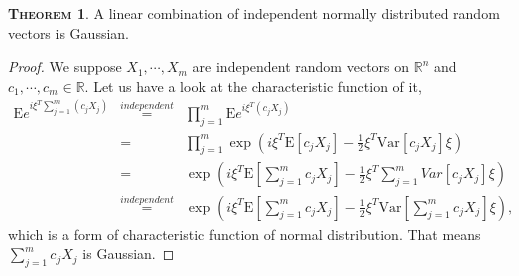 \documentclass[a4paper, twoside, 11pt]{article}
\theoremstyle{definition}
\newtheorem{theorem}[definition]{\scshape Theorem}
\newtheorem{corollary}[definition]{\scshape Corollary}
\newcommand{\brkt}[1]{\left({#1} \right)}
\begin{document}

	


  \begin{theorem}
	A linear combination of independent normally distributed random \\vectors is Gaussian.
  \end{theorem}

  \begin{proof}
	We suppose $X_1, \cdots, X_m$ are independent random vectors  on $\mathbb{R}^n$ and $c_1, \cdots, c_m \in \mathbb{R}$. Let us have a look at the characteristic function of it,
	\begin{eqnarray*}
	  \mathrm{E}e^{i\xi^T\sum_{j=1}^m(c_jX_j)} &\overset{independent}{=}&\prod_{j=1}^{m} \mathrm{E}e^{i\xi^T(c_jX_j)}\\
	  &=& \prod_{j=1}^m \exp\brkt{i\xi^T\mathrm{E}[c_jX_j]-\frac{1}{2}\xi^T\mathrm{Var}[c_jX_j]\xi}\\
	  &=&  \exp\brkt{i\xi^T\mathrm{E}[\sum_{j=1}^{m}c_jX_j]-\frac{1}{2}\xi^T\mathrm\sum_{j=1}^{m}{Var}[c_jX_j]\xi}\\
	  &\overset{independent}{=}&  \exp\brkt{i\xi^T\mathrm{E}[\sum_{j=1}^{m}c_jX_j]-\frac{1}{2}\xi^T\mathrm{Var}[\sum_{j=1}^{m}c_jX_j]\xi},
	\end{eqnarray*}
	which is a form of characteristic function of normal distribution. That means $\sum_{j=1}^m c_jX_j$ is Gaussian. 
  \end{proof}
\end{document}
